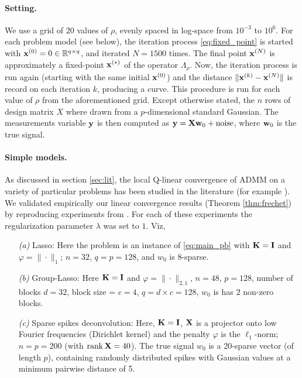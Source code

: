 \paragraph*{Setting.}
We use a grid of $20$ values of $\rho$, evenly spaced in
log-space from $10^{-3}$ to $10^6$. For each problem model (see below),
the iteration process \eqref{eq:fixed_point} is started with $\mathbf{x}^{(0)} = 0
\in \mathbb{R}^{q \times q}$, and iterated $N=1500$ times. The final
point $\mathbf{x}^{(N)}$ is approximately a fixed-point $\mathbf{x}^{(*)}$ of the operator
$\Lambda_\rho$. Now, the iteration process is run again (starting with the same
initial $\mathbf{x}^{(0)}$) and the distance $\|\mathbf{x}^{(k)} - \mathbf{x}^{(N)}\|$ is
record on each iteration $k$, producing a curve. This procedure is
run for each value of $\rho$ from the aforementioned grid.
Except otherwise stated, the $n$ rows of design matrix $X$ where drawn
from a $p$-dimensional standard Gaussian. The measurements variable
$\mathbf{y}$ is then computed as $\mathbf{y} = \mathbf{X}\mathbf{w}_0 + \textrm{noise}$, where
$\mathbf{w}_0$ is the true signal.

\paragraph*{Simple models.}
As discussed in section \ref{sec:lit}, the local Q-linear convergence
of ADMM on a variety of particular problems has been studied in the
literature (for example
\citep{ghadimi2013optimal,nishihara2015general,liang2014activity,liang2015activity}).
We validated empirically our linear convergence
results (Theorem \ref{thm:frechet}) by reproducing experiments from
\citep{liang2014activity,liang2015activity}. For each of these experiments
the regularization parameter $\lambda$ was set to $1$. Viz,

\begin{itemize}
\item[\textit{(a)}] Lasso: Here the problem is an instance of
  \eqref{eq:main_pb} with $\mathbf{K} = \mathbf{I}$ and $\varphi = \|\cdot\|_1$; $n =
  32$, $q=p=128$, and $w_0$ is 8-sparse.
\item[\textit{(b)}] Group-Lasso: Here $\mathbf{K} = \mathbf{I}$ and $\varphi =
  \|\cdot\|_{2,1}$, $n = 48$, $p=128$, number of blocks $d=32$, block
  size = $c=4$, $q = d \times c = 128$, $w_0$ is has $2$ non-zero blocks.
\item[\textit{(c)}] Sparse spikes deconvolution: Here, $\mathbf{K}=\mathbf{I}$, $\mathbf{X}$ is
  a projector  onto low Fourier frequencies (Dirichlet kernel) and the
  penalty $\varphi$ is the $\ell_1$-norm; $n=p=200$ (with $\operatorname{rank} \mathbf{X} =
  40$). The true signal $w_0$ is a 20-sparse vector (of length $p$),
  containing randomly distributed spikes with Gaussian values at a
  minimum pairwise distance of 5.
\end{itemize}

